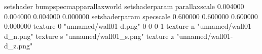 setshader bumpspecmapparallaxworld
setshaderparam parallaxscale 0.004000 0.004000 0.004000 0.000000
setshaderparam specscale 0.600000 0.600000 0.600000 0.000000
texture 0 "unnamed/wall01-d.png" 0 0 0 1
texture n "unnamed/wall01-d_n.png"
texture s "unnamed/wall01_s.png"
texture z "unnamed/wall01-d_z.png"